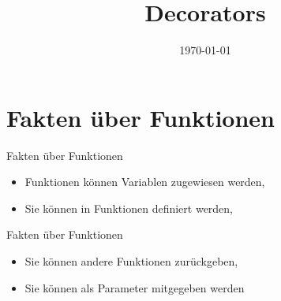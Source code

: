 


\newcommand{\topic}{
	Decorators
}

\title{\topic}
\supertitle{\course}
\date{\today}



\maketitle

\begin{frame}
	\tableofcontents
\end{frame}




\section{Fakten über Funktionen}
\begin{frame}{Fakten über Funktionen}
	\begin{itemize}
		\item Funktionen können Variablen zugewiesen werden,
		
		\item Sie können in Funktionen definiert werden,
		
	\end{itemize}
\end{frame}
\begin{frame}{Fakten über Funktionen}
	\begin{itemize}
		\item Sie können andere Funktionen zurückgeben,
		
		\item Sie können als Parameter mitgegeben werden
		
	\end{itemize}
\end{frame}

